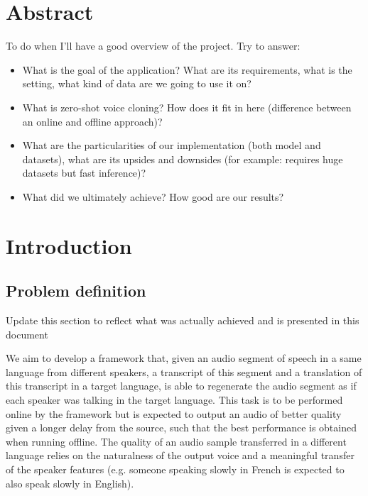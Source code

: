 \documentclass[a4paper, oneside]{article}
\begin{document}
\section{Abstract}
\color{red}
To do when I'll have a good overview of the project. Try to answer:
\begin{itemize}
	\item What is the goal of the application? What are its requirements, what is the setting, what kind of data are we going to use it on?
	\item What is zero-shot voice cloning? How does it fit in here (difference between an online and offline approach)?
	\item What are the particularities of our implementation (both model and datasets), what are its upsides and downsides (for example: requires huge datasets but fast inference)?
	\item What did we ultimately achieve? How good are our results?
\end{itemize}
\color{black}

\section{Introduction}

\subsection{Problem definition}
\color{red} Update this section to reflect what was actually achieved and is presented in this document \color{black}

We aim to develop a framework that, given an audio segment of speech in a same language from different speakers, a transcript of this segment and a translation of this transcript in a target language, is able to regenerate the audio segment as if each speaker was talking in the target language. This task is to be performed online by the framework but is expected to output an audio of better quality given a longer delay from the source, such that the best performance is obtained when running offline. The quality of an audio sample transferred in a different language relies on the naturalness of the output voice and a meaningful transfer of the speaker features (e.g. someone speaking slowly in French is expected to also speak slowly in English).
\end{document}
